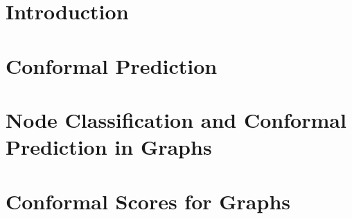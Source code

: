 \section{Introduction}


\section{Conformal Prediction}



\section{Node Classification and Conformal Prediction in Graphs}


\section{Conformal Scores for Graphs}





\begin{subappendices}
    
\end{subappendices}

